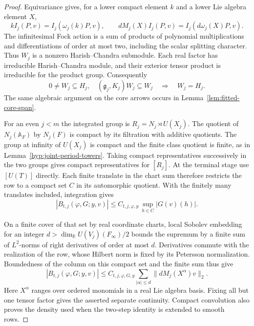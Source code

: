 \begin{proof}
Equivariance gives, for a lower compact element \(k\) and a
lower Lie algebra element \(X\),
\[
 k I_j(P,v)=I_j(\omega_j(k)P,v),\qquad
 dM_j(X)I_j(P,v)=I_j(d\omega_j(X)P,v).
\]
The infinitesimal Fock action is a sum of products of polynomial
multiplications and differentiations of order at most two, including
the scalar splitting character. Thus \(W_j\) is a nonzero
Harish--Chandra submodule. Each real factor has irreducible
Harish--Chandra module, and their exterior tensor product is
irreducible for the product group. Consequently
\[
  0\ne W_j\subseteq H_j,\quad
  (\mathfrak g_j,K_j)W_j\subseteq W_j
        \quad\Longrightarrow\quad W_j=H_j .
\]
The same algebraic argument on the core arrows occurs in
Lemma~\ref{lem:fitted-core-span}.

For an even \(j<m\) the integrated group is
\(R_j=N_j\rtimes U(X_j)\). The quotient of \(N_j(\mathbb A_F)\)
by \(N_j(F)\) is compact by its filtration with additive quotients.
The group at infinity of \(U(X_j)\) is compact and the finite
class quotient is finite, as in Lemma~\ref{hyp:joint-period-towers}.
Taking compact representatives successively in the two groups
gives compact representatives for \([R_j]\). At the terminal stage
use \([U(T)]\) directly. Each finite translate in the chart sum
therefore restricts the row to a compact set \(C\) in its automorphic
quotient. With the finitely many translates included, integration gives
\[
 |B_{t,j}(\varphi,G;y,v)|\le C_{t,j,\varphi,y}\,
                \sup_{h\in C}|G(v)(h)|.
\]

On a finite cover of that set by real coordinate charts, local
Sobolev embedding for an integer \(d>\dim_{\mathbb R} U(V_j)(F_\infty)/2\)
bounds the supremum by a finite sum of \(L^2\)-norms of right
derivatives of order at most \(d\). Derivatives commute with
the realization of the row, whose Hilbert norm is fixed by its
Petersson normalization. Boundedness of the column on this compact
set and the finite sum thus give
\[
 |B_{t,j}(\varphi,G;y,v)|
    \le C_{t,j,\varphi,G,y}
       \sum_{|\alpha|\le d}\|dM_j(X^{\alpha})v\|_2 .
\]
Here \(X^\alpha\) ranges over ordered monomials in a real Lie
algebra basis. Fixing all but one tensor factor gives the asserted
separate continuity. Compact convolution also proves the density
used when the two-step identity is extended to smooth rows.
\end{proof}

